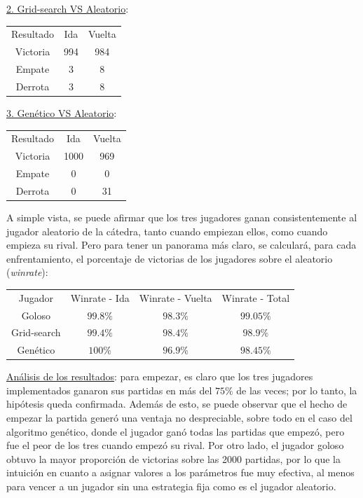 \documentclass[12pt,a4paper]{article}
\begin{document}
    \underline{2. Grid-search VS Aleatorio}:
    \begin{center}
		\begin{tabular}{ | c || c | c | }
		\hline
		Resultado &  Ida &  Vuelta \\ \hhline{|=#=|=|}
		    Victoria &  994 &  984 \\ \hline
		    Empate &  3 &  8 \\ \hline
		    Derrota &  3 &  8 \\ \hline
		\end{tabular}
    \end{center}
    
    \underline{3. Genético VS Aleatorio}:
    \begin{center}
		\begin{tabular}{ | c || c | c | }
		\hline
		Resultado &  Ida &  Vuelta \\ \hhline{|=#=|=|}
		    Victoria &  1000 &  969 \\ \hline
		    Empate &  0 &  0 \\ \hline
		    Derrota &  0 &  31 \\ \hline
		\end{tabular}
    \end{center}
    
    A simple vista, se puede afirmar que los tres jugadores ganan consistentemente al jugador aleatorio de la cátedra, tanto cuando empiezan ellos, como cuando empieza su rival. Pero para tener un panorama más claro, se calculará, para cada enfrentamiento, el porcentaje de victorias de los jugadores sobre el aleatorio (\textit{winrate}):
    
    \begin{center}
		\begin{tabular}{ | c || c | c | c |}
		\hline
		Jugador &  Winrate - Ida &  Winrate - Vuelta &  Winrate - Total \\ \hhline{|=#=|=|=|}
		    Goloso &  $99.8\%$ &  $98.3\%$ &  $99.05\%$ \\ \hline
		    Grid-search &  $99.4\%$ &  $98.4\%$ &  $98.9\%$  \\ \hline
		    Genético &  $100\%$ &  $96.9\%$ &  $98.45\%$ \\ \hline
		\end{tabular}
    \end{center}
    
    \underline{Análisis de los resultados}: para empezar, es claro que los tres jugadores implementados ganaron sus partidas en más del $75\%$ de las veces; por lo tanto, la hipótesis queda confirmada. Además de esto, se puede observar que el hecho de empezar la partida generó una ventaja no despreciable, sobre todo en el caso del algoritmo genético, donde el jugador ganó todas las partidas que empezó, pero fue el peor de los tres cuando empezó su rival. Por otro lado, el jugador goloso obtuvo la mayor proporción de victorias sobre las 2000 partidas, por lo que la intuición en cuanto a asignar valores a los parámetros fue muy efectiva, al menos para vencer a un jugador sin una estrategia fija como es el jugador aleatorio.
    
\end{document}
